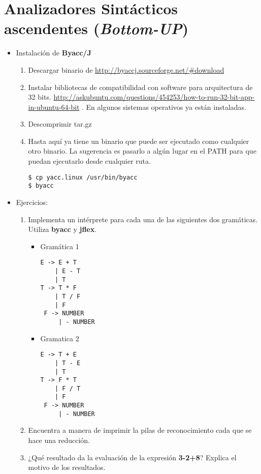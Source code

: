 \documentclass[11pt]{article}
\begin{document}
\section{Analizadores Sintácticos ascendentes (\emph{Bottom-UP})}
\label{sec:orgheadline2}
\begin{itemize}
\item Instalación de \textbf{Byacc/J}
\begin{enumerate}
\item Descargar binario de \url{http://byaccj.sourceforge.net/#download}
\item Instalar bibliotecas de compatibilidad con software para arquitectura de 32 bits.
\url{http://askubuntu.com/questions/454253/how-to-run-32-bit-app-in-ubuntu-64-bit} . 
En algunos sistemas operativos ya están instaladas.
\item Descomprimir tar.gz
\item Hasta aquí ya tiene un binario que puede ser ejecutado como cualquier otro binario.
La sugerencia es pasarlo a algún lugar en el PATH para que puedan ejecutarlo desde
cualquier ruta. 
\begin{verbatim}
$ cp yacc.linux /usr/bin/byacc
$ byacc
\end{verbatim}
\end{enumerate}

\item Ejercicios:
\begin{enumerate}
\item Implementa un intérprete para cada una de las siguientes dos gramáticas. Utiliza
\textbf{byacc} y \textbf{jflex}.
\begin{itemize}
\item Gramática 1 
\begin{verbatim}
E -> E + T
    | E - T
    | T
T -> T * F
    | T / F
    | F
 F -> NUMBER   
     | - NUMBER
\end{verbatim}
\item Gramatica 2
\begin{verbatim}
E -> T + E
    | T - E
    | T
T -> F * T
    | F / T
    | F
 F -> NUMBER   
     | - NUMBER
\end{verbatim}
\end{itemize}
\item Encuentra a manera de imprimir la pilas de reconocimiento cada que se hace una reducción.
\item ¿Qué resultado da la evaluación de la expresión \textbf{3-2+8}? Explica el motivo de los resultados.
\end{enumerate}
\end{itemize}
\end{document}
